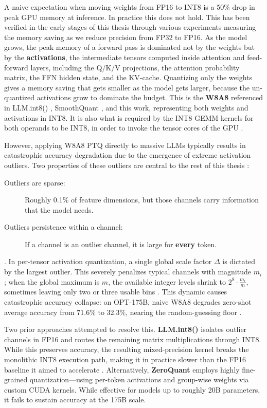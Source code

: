 A naive expectation when moving weights from FP16 to INT8 is a 50\% drop in peak GPU memory at inference. In practice this does not hold. This has been verified in the early stages of this thesis through various experiments measuring the memory saving as we reduce precision from FP32 to FP16.  As the model grows, the peak memory of a forward pass is dominated not by the weights but by the \textbf{activations}, the intermediate tensors computed inside attention and feed-forward layers, including the Q/K/V projections, the attention probability matrix, the FFN hidden state, and the KV-cache. Quantizing only the weights gives a memory saving that gets smaller as the model gets larger, because the un-quantized activations grow to dominate the budget. This is the \textbf{W8A8} referenced in LLM.int8() \cite{llm_int8_paper}, SmoothQuant \cite{smoothquant_paper}, and this work, representing both weights and activations in INT8. It is also what is required by the INT8 GEMM kernels for both operands to be INT8, in order to invoke the tensor cores of the GPU \cite{smoothquant_paper, llm_int8_paper}. 

However, applying W8A8 PTQ directly to massive LLMs typically results in catastrophic accuracy degradation due to the emergence of extreme activation outliers. Two properties of these outliers are central to the rest of this thesis \cite{llm_int8_paper}:
\begin{description}
    \item[Outliers are sparse:] Roughly 0.1\% of feature dimensions, but those channels carry information that the model needs.
    \item[Outliers persistence within a channel:] If a channel is an outlier channel, it is large for \textbf{every} token.
\end{description}.
In per-tensor activation quantization, a single global scale factor $\Delta$ is dictated by the largest outlier. This severely penalizes typical channels with magnitude $m_i$; when the global maximum is $m$, the available integer levels shrink to $2^8 \cdot \frac{m_i}{m}$, sometimes leaving only two or three usable bins \cite{smoothquant_paper}. This dynamic causes catastrophic accuracy collapse: on OPT-175B, naive W8A8 degrades zero-shot average accuracy from 71.6\% to 32.3\%, nearing the random-guessing floor \cite{smoothquant_paper}.

Two prior approaches attempted to resolve this. \textbf{LLM.int8()} \cite{llm_int8_paper} isolates outlier channels in FP16 and routes the remaining matrix multiplications through INT8. While this preserves accuracy, the resulting mixed-precision kernel breaks the monolithic INT8 execution path, making it in practice slower than the FP16 baseline it aimed to accelerate \cite{smoothquant_paper}. Alternatively, \textbf{ZeroQuant} \cite{zeroquant_paper} employs highly fine-grained quantization---using per-token activations and group-wise weights via custom CUDA kernels. While effective for models up to roughly 20B parameters, it fails to sustain accuracy at the 175B scale.

